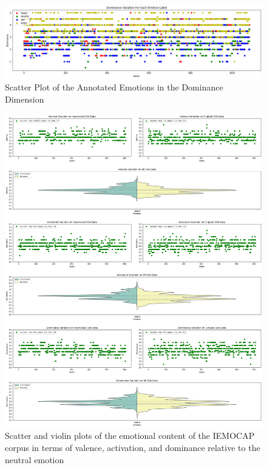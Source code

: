 \begin{figure}[H]
	\centering
	\includegraphics[width=1\linewidth]{figs/appendix/IEMOCAP_data_study/dominanceScatterAllEmotions.png}
	\caption{Scatter Plot of the Annotated Emotions in the Dominance Dimension}
	\label{fig:dominanceScatter}
\end{figure}


\begin{figure}[H]
	\centering
	\includegraphics[width=1\linewidth]{figs/appendix/IEMOCAP_data_study/neutralScatterViolins.png}
	\caption{Scatter and violin plots of the emotional content of the IEMOCAP corpus in terms of valence, activation, and dominance relative to the neutral emotion}
	\label{fig:neutralScatterViolins}
\end{figure}


